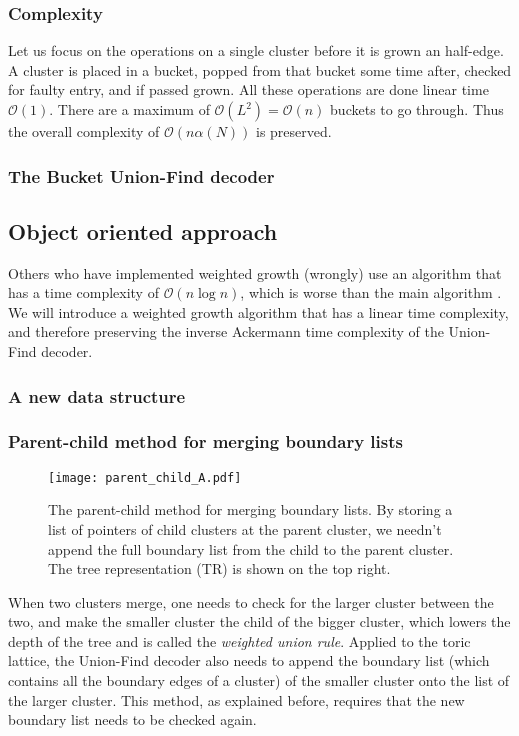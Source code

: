 \subsubsection{Complexity}
Let us focus on the operations on a single cluster before it is grown an half-edge. A cluster is placed in a bucket, popped from that bucket some time after, checked for faulty entry, and if passed grown. All these operations are done linear time $\mathcal{O}(1)$. There are a maximum of $\mathcal{O}(L^2) = \mathcal{O}(n)$ buckets to go through. Thus the overall complexity of $\mathcal{O}(n\alpha(N))$ is preserved.

\subsubsection{The Bucket Union-Find decoder}


\subsection{Object oriented approach}

Others who have implemented weighted growth (wrongly) use an algorithm that has a time complexity of $\mathcal{O}(n\log n)$, which is worse than the main algorithm \cite{nando}. We will introduce a weighted growth algorithm that has a linear time complexity, and therefore preserving the inverse Ackermann time complexity of the Union-Find decoder.

\subsubsection{A new data structure}

\subsubsection{Parent-child method for merging boundary lists}

\begin{figure}
  \centering
  \texttt{[image: parent\_child\_A.pdf]}
  \caption{The parent-child method for merging boundary lists. By storing a list of pointers of child clusters at the parent cluster, we needn't append the full boundary list from the child to the parent cluster. The tree representation (TR) is shown on the top right. } \label{3.fig.parentchildA}
\end{figure}

When two clusters merge, one needs to check for the larger cluster between the two, and make the smaller cluster the child of the bigger cluster, which lowers the depth of the tree and is called the \emph{weighted union rule}. Applied to the toric lattice, the Union-Find decoder also needs to append the boundary list (which contains all the boundary edges of a cluster) of the smaller cluster onto the list of the larger cluster. This method, as explained before, requires that the new boundary list needs to be checked again.

